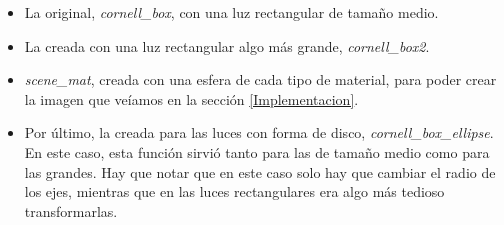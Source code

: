 \documentclass{scrbook}
\begin{document}
\begin{itemize}
	\item La original, \textit{cornell\_box}, con una luz rectangular de tamaño medio.
	\item La creada con una luz rectangular algo más grande, \textit{cornell\_box2}.
	\item \textit{scene\_mat}, creada con una esfera de cada tipo de material, para poder crear la imagen que veíamos en la sección \ref{Implementacion}.
	\item Por último, la creada para las luces con forma de disco, \textit{cornell\_box\_ellipse}. En este caso, esta función sirvió tanto para las de tamaño medio como para las grandes. Hay que notar que en este caso solo hay que cambiar el radio de los ejes, mientras que en las luces rectangulares era algo más tedioso transformarlas.
\end{itemize}



\backmatter %



\begin{small} %

\end{small}



\cleardoublepage 
{} 
\begin{footnotesize} %
\printindex 
\end{footnotesize}
\end{document}
